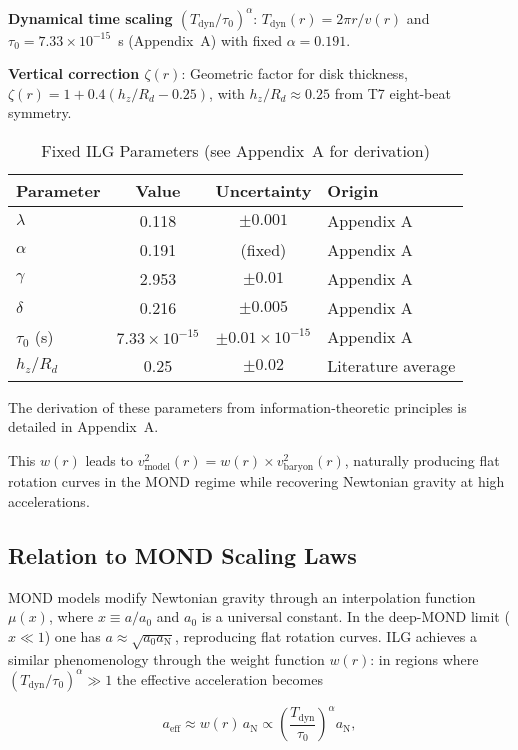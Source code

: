 \documentclass[12pt,a4paper]{article}
\begin{document}
\textbf{Dynamical time scaling $(T_\mathrm{dyn}/\tau_0)^\alpha$}: $T_\mathrm{dyn}(r) = 2\pi r / v(r)$ and $\tau_0 = 7.33 \times 10^{-15}$~s (Appendix~A) with fixed $\alpha = 0.191$.

\textbf{Vertical correction $\zeta(r)$}: Geometric factor for disk thickness, $\zeta(r) = 1 + 0.4 (h_z / R_d - 0.25)$, with $h_z / R_d \approx 0.25$ from T7 eight-beat symmetry.

\begin{table}[h]
\centering
\caption{Fixed ILG Parameters (see Appendix~A for derivation)}
\label{tab:parameters}
\begin{tabular}{l c c l}
\toprule
Parameter & Value & Uncertainty & Origin \\
\midrule
$\lambda$ & 0.118 & $\pm 0.001$ & Appendix A \\
$\alpha$ & 0.191 & (fixed) & Appendix A \\
$\gamma$ & 2.953 & $\pm 0.01$ & Appendix A \\
$\delta$ & 0.216 & $\pm 0.005$ & Appendix A \\
$\tau_0$ (s) & $7.33 \times 10^{-15}$ & $\pm 0.01 \times 10^{-15}$ & Appendix A \\
$h_z / R_d$ & 0.25 & $\pm 0.02$ & Literature average \\
\bottomrule
\end{tabular}
\end{table}

The derivation of these parameters from information-theoretic principles is detailed in Appendix~A.

This $w(r)$ leads to $v^2_\mathrm{model}(r) = w(r) \times v^2_\mathrm{baryon}(r)$, naturally producing flat rotation curves in the MOND regime while recovering Newtonian gravity at high accelerations.

\subsection{Relation to MOND Scaling Laws}

MOND models modify Newtonian gravity through an interpolation function $\mu(x)$, where $x \equiv a/a_0$ and $a_0$ is a universal constant.  In the deep-MOND limit ($x \ll 1$) one has $a \approx \sqrt{a_0 a_\mathrm{N}}$, reproducing flat rotation curves.  ILG achieves a similar phenomenology through the weight function $w(r)$: in regions where $(T_\mathrm{dyn}/\tau_0)^\alpha \gg 1$ the effective acceleration becomes

\begin{equation}
a_\mathrm{eff} \approx w(r) \, a_\mathrm{N} \propto \left(\frac{T_\mathrm{dyn}}{\tau_0}\right)^\alpha a_\mathrm{N},
\end{equation}
\end{document}
